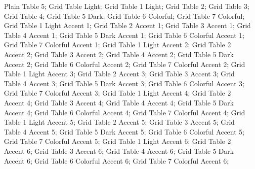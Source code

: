   Plain Table 5;  Grid
Table Light;  Grid Table 1 Light;
 Grid Table 2;  Grid Table
3;  Grid Table 4;  
Grid Table 5 Dark;  Grid Table 6
Colorful;  Grid Table 7 Colorful;
 Grid Table 1 Light Accent 1;  Grid
Table 2 Accent 1;   Grid Table 3 Accent
1;  Grid Table 4 Accent 1;
 Grid Table 5 Dark Accent 1;  Grid
Table 6 Colorful Accent 1;   Grid Table 7
Colorful Accent 1;  Grid Table 1 Light Accent
2;  Grid Table 2 Accent 2;
 Grid Table 3 Accent 2;   Grid Table
4 Accent 2;  Grid Table 5 Dark Accent
2;  Grid Table 6 Colorful Accent
2;  Grid Table 7 Colorful Accent 2;
  Grid Table 1 Light Accent 3;
 Grid Table 2 Accent 3;  Grid Table
3 Accent 3;  Grid Table 4 Accent 3;
  Grid Table 5 Dark Accent 3;
 Grid Table 6 Colorful Accent 3; 
Grid Table 7 Colorful Accent 3;  Grid Table 1
Light Accent 4;   Grid Table 2 Accent
4;  Grid Table 3 Accent 4;
 Grid Table 4 Accent 4;  Grid Table
5 Dark Accent 4;   Grid Table 6 Colorful Accent
4;  Grid Table 7 Colorful Accent
4;  Grid Table 1 Light Accent 5;
 Grid Table 2 Accent 5;   Grid Table
3 Accent 5;  Grid Table 4 Accent
5;  Grid Table 5 Dark Accent 5;
 Grid Table 6 Colorful Accent 5;  
Grid Table 7 Colorful Accent 5;  Grid Table 1
Light Accent 6;  Grid Table 2 Accent
6;  Grid Table 3 Accent 6; 
 Grid Table 4 Accent 6;  Grid Table
5 Dark Accent 6;  Grid Table 6 Colorful Accent
6;  Grid Table 7 Colorful Accent 6;
